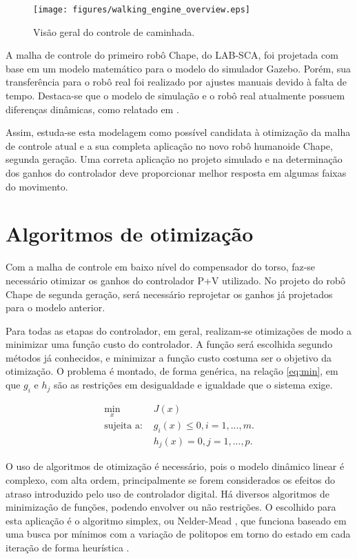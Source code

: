 \begin{figure} 
	\centering
	\texttt{[image: figures/walking\_engine\_overview.eps]}
	\caption{Visão geral do controle de caminhada.}
	\label{FIG: doc manga}
\end{figure} 

A malha de controle do primeiro robô Chape, do LAB-SCA, foi projetada com base em um modelo matemático para o modelo do simulador Gazebo. Porém, sua transferência para o robô real foi realizado por ajustes manuais devido à falta de tempo. Destaca-se que o modelo de simulação e o robô real atualmente possuem diferenças dinâmicas, como relatado em \cite{tesemarcos}.

Assim, estuda-se esta modelagem como possível candidata à otimização da malha de controle atual e a sua completa aplicação no novo robô humanoide Chape, segunda geração. Uma correta aplicação no projeto simulado e na determinação dos ganhos do controlador deve proporcionar melhor resposta em algumas faixas do movimento.

\section{Algoritmos de otimização}

Com a malha de controle em baixo nível do compensador do torso, faz-se necessário otimizar os ganhos do controlador P+V utilizado. No projeto do robô Chape de segunda geração, será necessário reprojetar os ganhos já projetados para o modelo anterior.

Para todas as etapas do controlador, em geral, realizam-se otimizações de modo a minimizar uma função custo do controlador. A função será escolhida segundo métodos já conhecidos, e minimizar a função custo costuma ser o objetivo da otimização. O problema é montado, de forma genérica, na relação \eqref{eq:min}, em que $g_i$ e $h_j$ são as restrições em desigualdade e igualdade que o sistema exige.

\begin{equation}
\label{eq:min}
\begin{aligned}
\underset{x}{\min} & J(x)\\
\text{sujeita a: } & g_i(x) \leq 0, i = 1, ..., m.\\
& h_j(x) = 0, j = 1,...,p. 
\end{aligned}
\end{equation}

O uso de algoritmos de otimização é necessário, pois o modelo dinâmico linear é complexo, com alta ordem, principalmente se forem considerados os efeitos do atraso introduzido pelo uso de controlador digital. Há diversos algoritmos de minimização de funções, podendo envolver ou não restrições. O escolhido para esta aplicação é o algoritmo simplex, ou Nelder-Mead \cite{lagarias1998}, que funciona baseado em uma busca por mínimos com a variação de politopos em torno do estado em cada iteração de forma heurística \cite{NoceWrig06}.

